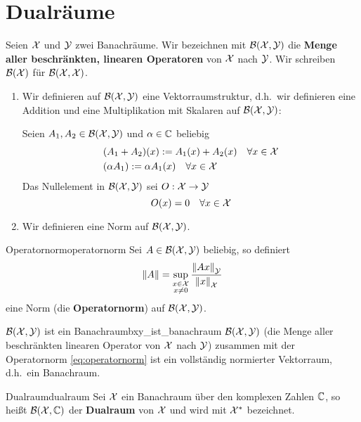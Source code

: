 \section{Dualräume}

Seien $\mathcal{X}$ und $\mathcal{Y}$ zwei Banachräume.
Wir bezeichnen mit $\mathcal{B}(\mathcal{X},\mathcal{Y})$ die \textbf{Menge aller beschränkten, linearen Operatoren} von $\mathcal{X}$ nach $\mathcal{Y}$.
Wir schreiben $\mathcal{B}(\mathcal{X})$ für $\mathcal{B}(\mathcal{X}, \mathcal{X})$.

\begin{enumerate}
  \item Wir definieren auf $\mathcal{B}(\mathcal{X}, \mathcal{Y})$ eine Vektorraumstruktur, d.h.\ wir definieren eine Addition und eine Multiplikation mit Skalaren auf $\mathcal{B}(\mathcal{X},\mathcal{Y})$:

  Seien $A_1, A_2 \in \mathcal{B}(\mathcal{X},\mathcal{Y})$ und $\alpha \in \mathbb{C}$ beliebig
  \begin{align*}
    &(A_1 + A_2)(x) := A_1(x) + A_2(x) \quad \forall x \in \mathcal{X}\\
    &(\alpha A_1) := \alpha A_1(x) \quad \forall x \in \mathcal{X}
  \end{align*}
  Das Nullelement in $\mathcal{B}(\mathcal{X},\mathcal{Y})$ sei $O:\mathcal{X} \to \mathcal{Y}$
  \begin{equation*}
  O(x) = 0 \quad \forall x \in \mathcal{X}
  \end{equation*}

  \item Wir definieren eine Norm auf $\mathcal{B}(\mathcal{X},\mathcal{Y})$.
\end{enumerate}

\begin{mytheo}{Operatornorm}{operatornorm}
Sei $A \in \mathcal{B}(\mathcal{X},\mathcal{Y})$ beliebig, so definiert
\begin{equation}
    \|A\| = \sup_{\substack{x\in\mathcal{X}\\ x\neq 0}} \dfrac{{\|A x\|}_{\mathcal{Y}}}{{\|x\|}_{\mathcal{X}}}\label{eq:operatornorm}
\end{equation}
eine Norm (die \textbf{Operatornorm}) auf $\mathcal{B}(\mathcal{X},\mathcal{Y})$.
\end{mytheo}

\begin{mytheo}{$\mathcal{B}(\mathcal{X},\mathcal{Y})$ ist ein Banachraum}{bxy_ist_banachraum}
$\mathcal{B}(\mathcal{X},\mathcal{Y})$ (die Menge aller beschränkten linearen Operator von $\mathcal{X}$ nach $\mathcal{Y}$) zusammen mit der Operatornorm \eqref{eq:operatornorm} ist ein vollständig normierter Vektorraum, d.h.\ ein Banachraum.
\end{mytheo}

\begin{boringDef}{Dualraum}{dualraum}
  Sei $\mathcal{X}$ ein Banachraum über den komplexen Zahlen $\mathbb{C}$, so heißt $\mathcal{B}(\mathcal{X}, \mathbb{C})$ der \textbf{Dualraum} von $\mathcal{X}$ und wird mit $\mathcal{X}^{*}$ bezeichnet.
\end{boringDef}

